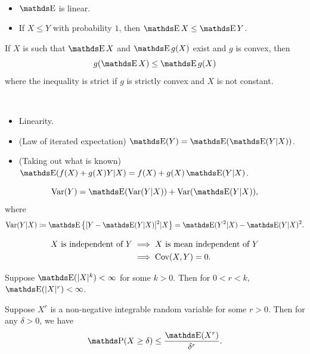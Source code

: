 \begin{proposition}~
  \begin{itemize}
    \item \(\E\) is linear.
    \item If \(X \leq Y\) with probability \(1\), then \(\E X \leq \E Y\).
  \end{itemize}
\end{proposition}

\begin{theorem}
  If \(X\) is such that \(\E X\) and \(\E g(X)\) exist and \(g\) is convex, then 
  \[
    g(\E X) \leq \E g(X)
  \] 
  where the inequality is strict if \(g\) is strictly convex and \(X\) is not constant.
\end{theorem}

\begin{proposition}~
  \begin{itemize}
    \item Linearity.
    \item (Law of iterated expectation) \(\E(Y) = \E(\E(Y|X))\).
    \item (Taking out what is known) \(\E(f(X) + g(X) Y | X) = f(X) + g(X) \E(Y|X)\).
  \end{itemize}
\end{proposition}

\begin{proposition}
  \[
    \Var(Y)
    = \E(\Var(Y|X)) + \Var(\E(Y|X)),
  \]
  where
  \[
    \Var(Y|X) \coloneqq \E\left\{ [Y - \E(Y|X)]^2 | X \right\} = \E(Y^2|X) - \E(Y|X)^2.
  \]
\end{proposition}

\begin{proposition}
  \begin{align*}
    X \text{ is independent of } Y
    &\implies
    X \text{ is mean independent of } Y \\
    &\implies \operatorname{Cov}(X, Y) = 0.
  \end{align*}
\end{proposition}

\begin{proposition}
  Suppose \(\E(\abs{X}^k) < \infty\) for some \(k > 0\).
  Then for \(0 < r < k\), \(\E(\abs{X}^r) < \infty\).
\end{proposition}

\begin{theorem}
  Suppose \(X^r\) is a non-negative integrable random variable for some \(r > 0\).
  Then for any \(\delta > 0\), we have
  \[
    \P(X \geq \delta) \leq \frac{\E(X^r)}{\delta^r}.
  \]
\end{theorem}

